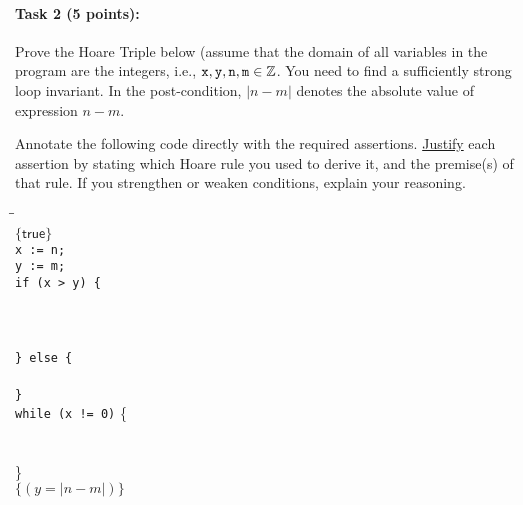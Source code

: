 \documentclass[11pt,a4paper]{article}
\begin{document}
\clearpage

\paragraph{Task 2 (5 points):}

Prove the Hoare Triple below (assume that the domain of
all variables in the program are the integers,
i.e., ${\tt x}, {\tt y}, {\tt n}, {\tt m}\in\mathbb{Z}$.
You need to find a sufficiently strong loop invariant.
In the post-condition, $\vert n-m \vert$ denotes the absolute value of expression $n-m$.

Annotate the following code directly with the required assertions.
\underline{Justify} each assertion by stating which Hoare rule you used
to derive it, and the premise(s) of that rule. If you strengthen
or weaken conditions, explain your reasoning.

\begin{tabbing}
  \quad\=\quad\=\quad\=\\\kill
  $\{\mathsf{true}\}$\\[5ex]
  {\tt x := n;}\\[5ex]
  {\tt y := m;}\\[5ex]
  {\tt if (x > y) \{}\\[5ex]
  \\[5ex]
  \\[5ex]
  \\[5ex]
  {\tt\} else \{ }\\[5ex]
  \\[5ex]
  {\tt \}}\\[5ex]
  {\tt while (x != 0)} \{\\[5ex]
  \\[5ex]
  \\[5ex]
  {\}}\\[5ex]
  $\{(y = \vert n - m\vert)\}$
\end{tabbing}

\clearpage
\end{document}
